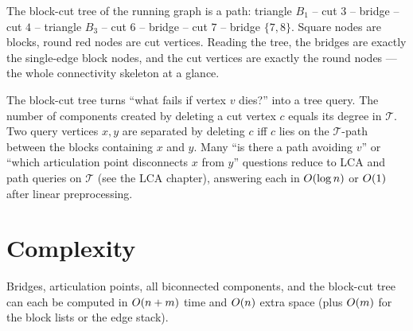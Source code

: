 \begin{center}
\end{center}

The block-cut tree of the running graph is a path: triangle $B_1$ -- cut $3$ -- bridge
-- cut $4$ -- triangle $B_3$ -- cut $6$ -- bridge -- cut $7$ -- bridge $\{7,8\}$. Square
nodes are blocks, round red nodes are cut vertices. Reading the tree, the bridges are
exactly the single-edge block nodes, and the cut vertices are exactly the round nodes
--- the whole connectivity skeleton at a glance.

\begin{applicationbox}
The block-cut tree turns ``what fails if vertex $v$ dies?'' into a tree query. The
number of components created by deleting a cut vertex $c$ equals its degree in
$\mathcal{T}$. Two query vertices $x,y$ are separated by deleting $c$ iff $c$ lies on
the $\mathcal{T}$-path between the blocks containing $x$ and $y$. Many ``is there a
path avoiding $v$'' or ``which articulation point disconnects $x$ from $y$'' questions
reduce to LCA and path queries on $\mathcal{T}$ (see the LCA chapter), answering each in
$O(\log n)$ or $O(1)$ after linear preprocessing.
\end{applicationbox}

\section{Complexity}
\label{ch10:complexity}

\begin{theorem}
\label{ch10:thm-time}
Bridges, articulation points, all biconnected components, and the block-cut tree can
each be computed in $O(n+m)$ time and $O(n)$ extra space (plus $O(m)$ for the
block lists or the edge stack).
\end{theorem}

